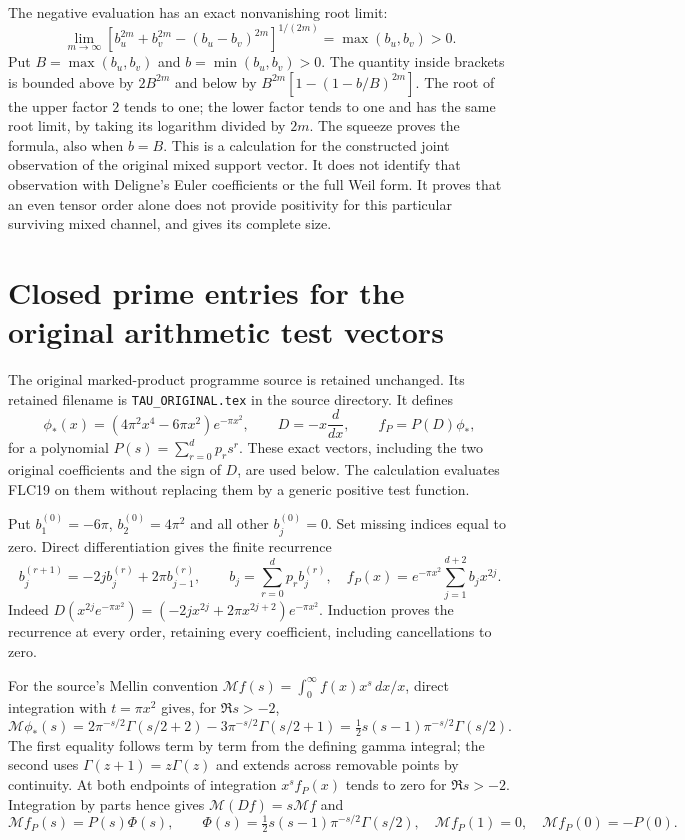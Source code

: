 \documentclass[11pt]{article}
\begin{document}
The negative evaluation has an exact nonvanishing root limit:
\[
\lim_{m\to\infty}
\left[b_u^{2m}+b_v^{2m}-(b_u-b_v)^{2m}\right]^{1/(2m)}
 =\max(b_u,b_v)>0.
\tag{JMD23}
\]
Put $B=\max(b_u,b_v)$ and $b=\min(b_u,b_v)>0$.
The quantity inside brackets is bounded above by $2B^{2m}$ and
below by $B^{2m}[1-(1-b/B)^{2m}]$.
The root of the upper factor $2$ tends to one; the lower factor tends
to one and has the same root limit, by taking its logarithm divided
by $2m$. The squeeze proves the formula, also when $b=B$.
This is a calculation for the constructed joint observation of the
original mixed support vector. It does not identify that observation
with Deligne's Euler coefficients or the full Weil form. It proves
that an even tensor order alone does not provide positivity for this
particular surviving mixed channel, and gives its complete size.



\section{Closed prime entries for the original arithmetic test vectors}
\label{sec:original-gaussian-prime}

The original marked-product programme source is retained unchanged.
Its retained filename is \texttt{TAU\_ORIGINAL.tex} in the source directory.
It defines
\[
\phi_*(x)=(4\pi^2x^4-6\pi x^2)e^{-\pi x^2},\qquad
D=-x\frac{d}{dx},\qquad f_P=P(D)\phi_*,
\tag{GPE1}
\]
for a polynomial $P(s)=\sum_{r=0}^d p_rs^r$. These exact vectors,
including the two original coefficients and the sign of $D$, are used
below. The calculation evaluates FLC19 on them without replacing them
by a generic positive test function.

Put $b^{(0)}_1=-6\pi$, $b^{(0)}_2=4\pi^2$ and all other
$b^{(0)}_j=0$. Set missing indices equal to zero. Direct differentiation
gives the finite recurrence
\[
b^{(r+1)}_j=-2j b^{(r)}_j+2\pi b^{(r)}_{j-1},\qquad
b_j=\sum_{r=0}^d p_rb^{(r)}_j,
\quad
f_P(x)=e^{-\pi x^2}\sum_{j=1}^{d+2}b_jx^{2j}.
\tag{GPE2}
\]
Indeed $D(x^{2j}e^{-\pi x^2})=
(-2j x^{2j}+2\pi x^{2j+2})e^{-\pi x^2}$.
Induction proves the recurrence at every order, retaining every
coefficient, including cancellations to zero.

For the source's Mellin convention
$\mathcal M f(s)=\int_0^\infty f(x)x^s\,dx/x$, direct integration
with $t=\pi x^2$ gives, for $\Re s>-2$,
\[
\mathcal M\phi_*(s)
=2\pi^{-s/2}\Gamma(s/2+2)-3\pi^{-s/2}\Gamma(s/2+1)
=\tfrac12s(s-1)\pi^{-s/2}\Gamma(s/2).
\tag{GPE3}
\]
The first equality follows term by term from the defining gamma
integral; the second uses $\Gamma(z+1)=z\Gamma(z)$ and extends across
removable points by continuity. At both endpoints of integration
$x^sf_P(x)$ tends to zero for $\Re s>-2$. Integration by parts hence
gives $\mathcal M(Df)=s\mathcal M f$ and
\[
\mathcal M f_P(s)=P(s)\Phi(s),\qquad
\Phi(s)=\tfrac12s(s-1)\pi^{-s/2}\Gamma(s/2),
\quad\mathcal M f_P(1)=0,\quad\mathcal M f_P(0)=-P(0).
\tag{GPE4}
\]
\end{document}
